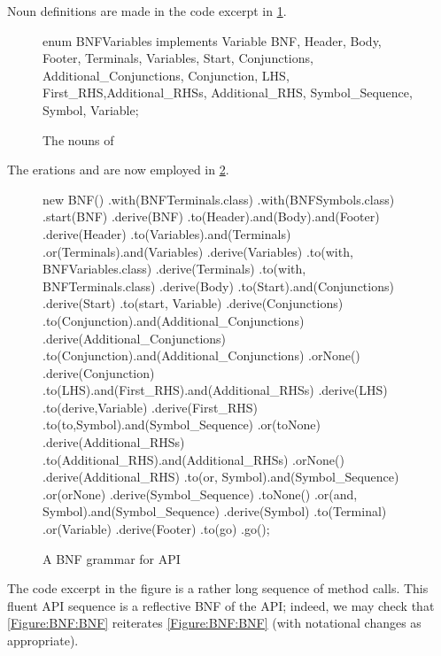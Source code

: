 Noun definitions are made in the code excerpt in \cref{Figure:Nouns}.

\begin{figure}[H]
  \begin{JAVA}[style=code]
enum BNFVariables implements Variable {
  BNF, Header, Body, Footer,
  Terminals, Variables, Start,
  Conjunctions, Additional_Conjunctions,
  Conjunction, LHS, First_RHS,Additional_RHSs,
  Additional_RHS, Symbol_Sequence,
  Symbol, Variable;
}\end{JAVA}
  \caption{The nouns of \SELF}
  \label{Figure:Nouns}
\end{figure}

The
erations  and
  are now employed in \cref{Figure:BNF:fluent}.


\begin{figure}[H]
  \begin{JAVA}[style=numbered]
new BNF()
  .with(BNFTerminals.class)
  .with(BNFSymbols.class)
  .start(BNF)
  .derive(BNF)
    .to(Header).and(Body).and(Footer)
  .derive(Header)
    .to(Variables).and(Terminals)
    .or(Terminals).and(Variables)
  .derive(Variables)
    .to(with, BNFVariables.class)
  .derive(Terminals)
    .to(with, BNFTerminals.class)
  .derive(Body)
    .to(Start).and(Conjunctions)
  .derive(Start)
    .to(start, Variable)
  .derive(Conjunctions)
    .to(Conjunction).and(Additional_Conjunctions)
  .derive(Additional_Conjunctions)
    .to(Conjunction).and(Additional_Conjunctions)
    .orNone()
  .derive(Conjunction)
    .to(LHS).and(First_RHS).and(Additional_RHSs)
  .derive(LHS)
    .to(derive,Variable)
  .derive(First_RHS)
    .to(to,Symbol).and(Symbol_Sequence)
    .or(toNone)
  .derive(Additional_RHSs)
    .to(Additional_RHS).and(Additional_RHSs)
    .orNone()
  .derive(Additional_RHS)
    .to(or, Symbol).and(Symbol_Sequence)
    .or(orNone)
  .derive(Symbol_Sequence)
    .toNone()
    .or(and, Symbol).and(Symbol_Sequence)
  .derive(Symbol)
    .to(Terminal)
    .or(Variable)
  .derive(Footer)
    .to(go)
.go();\end{JAVA}
  \caption{A BNF grammar for \SELF API}
  \label{Figure:BNF:fluent}
\end{figure}

The code excerpt in the figure is a rather long
  sequence of method calls.
This fluent API sequence is a reflective BNF 
  of the \SELF API;
  indeed, we may check that \cref{Figure:BNF:BNF} reiterates \cref{Figure:BNF:BNF}
  (with notational changes as appropriate). 

